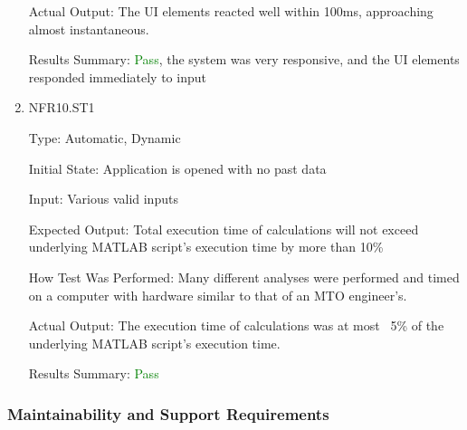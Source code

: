 \documentclass[12pt, titlepage]{article}
\begin{document}
\begin{enumerate}
Actual Output: The UI elements reacted well within 100ms, approaching almost instantaneous.

Results Summary: \textcolor{green} {Pass}, the system was very responsive, and the UI elements responded immediately to input

\item{NFR10.ST1\\}

Type: Automatic, Dynamic

Initial State: Application is opened with no past data

Input: Various valid inputs

Expected Output: Total execution time of calculations will not exceed underlying MATLAB script's execution time by more than 10\%

How Test Was Performed: Many different analyses were performed and timed on a computer with hardware similar to that of an MTO engineer's.

Actual Output: The execution time of calculations was at most ~5\% of the underlying MATLAB script's execution time.

Results Summary: \textcolor{green} {Pass}

\end{enumerate}

\subsubsection{Maintainability and Support Requirements}
\end{document}
